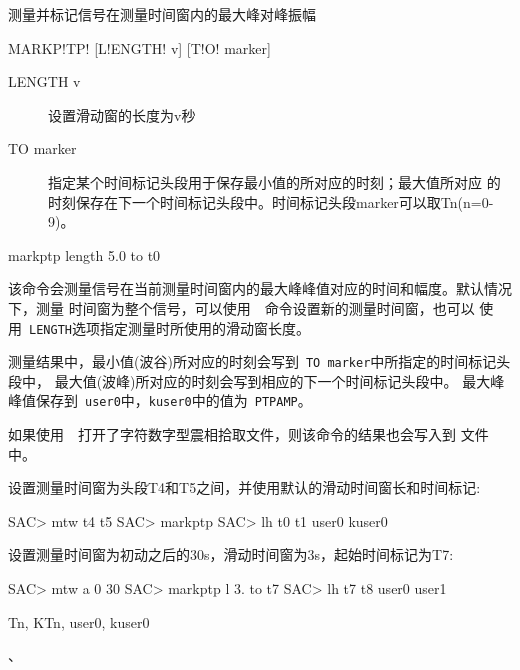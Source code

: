 \label{cmd:markptp}

测量并标记信号在测量时间窗内的最大峰对峰振幅

\begin{SACSTX}
MARKP!TP! [L!ENGTH! v] [T!O! marker]
\end{SACSTX}

\begin{description}
\item [LENGTH v] 设置滑动窗的长度为v秒
\item [TO marker] 指定某个时间标记头段用于保存最小值的所对应的时刻；最大值所对应
    的时刻保存在下一个时间标记头段中。时间标记头段marker可以取Tn(n=0-9)。
\end{description}

\begin{SACDFT}
markptp length 5.0 to t0
\end{SACDFT}

该命令会测量信号在当前测量时间窗内的最大峰峰值对应的时间和幅度。默认情况下，测量
时间窗为整个信号，可以使用~~命令设置新的测量时间窗，也可以
使用~\verb+LENGTH+选项指定测量时所使用的滑动窗长度。

测量结果中，最小值(波谷)所对应的时刻会写到~\verb+TO marker+中所指定的时间标记头段中，
最大值(波峰)所对应的时刻会写到相应的下一个时间标记头段中。
最大峰峰值保存到~\verb+user0+中，\verb+kuser0+中的值为~\verb+PTPAMP+。

如果使用~~打开了字符数字型震相拾取文件，则该命令的结果也会写入到
文件中。

设置测量时间窗为头段T4和T5之间，并使用默认的滑动时间窗长和时间标记:
\begin{SACCode}
SAC> mtw t4 t5
SAC> markptp
SAC> lh t0 t1 user0 kuser0
\end{SACCode}

设置测量时间窗为初动之后的30s，滑动时间窗为3s，起始时间标记为T7:
\begin{SACCode}
SAC> mtw a 0 30
SAC> markptp l 3. to t7
SAC> lh t7 t8 user0 user1
\end{SACCode}

Tn, KTn, user0, kuser0

、
